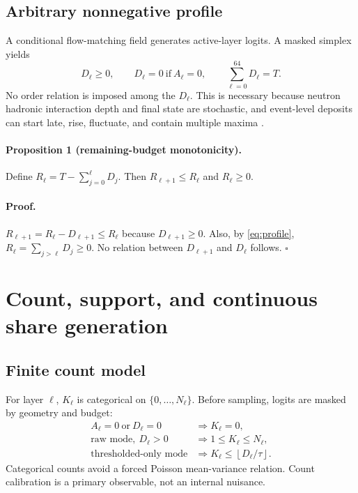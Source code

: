 \documentclass[10pt,a4paper]{article}
\begin{document}
\subsection{Arbitrary nonnegative profile}
A conditional flow-matching field generates active-layer logits. A masked simplex yields
\begin{equation}
 D_\ell\ge0,\qquad D_\ell=0\ \text{if}\ A_\ell=0,\qquad \sum_{\ell=0}^{64}D_\ell=T.
 \label{eq:profile}
\end{equation}
No order relation is imposed among the $D_\ell$. This is necessary because neutron hadronic interaction depth and final state are stochastic, and event-level deposits can start late, rise, fluctuate, and contain multiple maxima \cite{geant4_2003,geant4_2016,kulchitsky}.

\paragraph{Proposition 1 (remaining-budget monotonicity).}
Define $R_\ell=T-\sum_{j=0}^{\ell}D_j$. Then $R_{\ell+1}\le R_\ell$ and $R_\ell\ge0$.

\paragraph{Proof.}
$R_{\ell+1}=R_\ell-D_{\ell+1}\le R_\ell$ because $D_{\ell+1}\ge0$. Also, by \cref{eq:profile}, $R_\ell=\sum_{j>\ell}D_j\ge0$. No relation between $D_{\ell+1}$ and $D_\ell$ follows. \hfill$\square$

\section{Count, support, and continuous share generation}

\subsection{Finite count model}
For layer $\ell$, $K_\ell$ is categorical on $\{0,\ldots,N_\ell\}$. Before sampling, logits are masked by geometry and budget:
\begin{align}
A_\ell=0\ \text{or}\ D_\ell=0 &\Rightarrow K_\ell=0,\\
\text{raw mode},\ D_\ell>0 &\Rightarrow 1\le K_\ell\le N_\ell,\\
\text{thresholded-only mode} &\Rightarrow K_\ell\le\left\lfloor D_\ell/\tau\right\rfloor.
\end{align}
Categorical counts avoid a forced Poisson mean-variance relation. Count calibration is a primary observable, not an internal nuisance.
\end{document}
